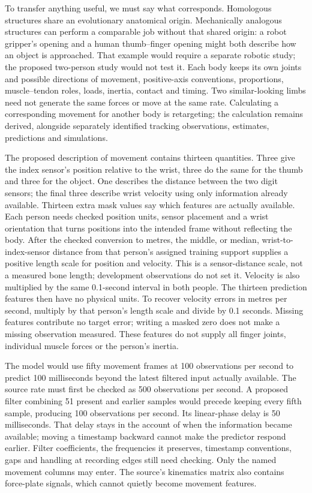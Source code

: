 To transfer anything useful, we must say what corresponds. Homologous structures share an evolutionary anatomical origin. Mechanically analogous structures can perform a comparable job without that shared origin: a robot gripper's opening and a human thumb--finger opening might both describe how an object is approached. That example would require a separate robotic study; the proposed two-person study would not test it. Each body keeps its own joints and possible directions of movement, positive-axis conventions, proportions, muscle--tendon roles, loads, inertia, contact and timing. Two similar-looking limbs need not generate the same forces or move at the same rate. Calculating a corresponding movement for another body is retargeting; the calculation remains derived, alongside separately identified tracking observations, estimates, predictions and simulations.

The proposed description of movement contains thirteen quantities. Three give the index sensor's position relative to the wrist, three do the same for the thumb and three for the object. One describes the distance between the two digit sensors; the final three describe wrist velocity using only information already available. Thirteen extra mask values say which features are actually available. Each person needs checked position units, sensor placement and a wrist orientation that turns positions into the intended frame without reflecting the body. After the checked conversion to metres, the middle, or median, wrist-to-index-sensor distance from that person's assigned training support supplies a positive length scale for position and velocity. This is a sensor-distance scale, not a measured bone length; development observations do not set it. Velocity is also multiplied by the same 0.1-second interval in both people. The thirteen prediction features then have no physical units. To recover velocity errors in metres per second, multiply by that person's length scale and divide by 0.1 seconds. Missing features contribute no target error; writing a masked zero does not make a missing observation measured. These features do not supply all finger joints, individual muscle forces or the person's inertia.

The model would use fifty movement frames at 100 observations per second to predict 100 milliseconds beyond the latest filtered input actually available. The source rate must first be checked as 500 observations per second. A proposed filter combining 51 present and earlier samples would precede keeping every fifth sample, producing 100 observations per second. Its linear-phase delay is 50 milliseconds. That delay stays in the account of when the information became available; moving a timestamp backward cannot make the predictor respond earlier. Filter coefficients, the frequencies it preserves, timestamp conventions, gaps and handling at recording edges still need checking. Only the named movement columns may enter. The source's kinematics matrix also contains force-plate signals, which cannot quietly become movement features.


